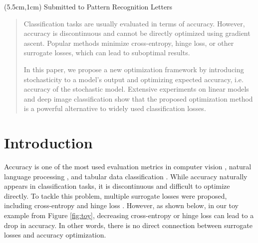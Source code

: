 \documentclass[nohyperref]{article}
\theoremstyle{plain}
\theoremstyle{definition}
\theoremstyle{remark}
\begin{document}





\printAffiliationsAndNotice{} 

\begin{textblock*}{12cm}(5.5cm,1cm) \LARGE \textcolor{gray!50}{Submitted to Pattern Recognition Letters}
\end{textblock*}

\begin{abstract}
Classification tasks are usually evaluated in terms of accuracy. However, accuracy is discontinuous and cannot be directly optimized using gradient ascent. Popular methods minimize cross-entropy, hinge loss, or other surrogate losses, which can lead to suboptimal results.

In this paper, we propose a new optimization framework by introducing stochasticity to a model's output and optimizing expected accuracy, i.e. accuracy of the stochastic model. Extensive experiments on linear models and deep image classification show that the proposed optimization method is a powerful alternative to widely used classification losses.



\end{abstract}
\setcounter{footnote}{1}

\section{Introduction}
Accuracy is one of the most used evaluation metrics in computer vision \cite{lecun1998mnist,krizhevsky2009cifar,krizhevsky2012imagenetcls}, natural language processing \cite{maas2011nlpsentiment, zhang2015textcls}, and tabular data classification \cite{arik2021tabnet}.
While accuracy naturally appears in classification tasks, it is discontinuous and difficult to optimize directly. To tackle this problem, multiple surrogate losses were proposed, including cross-entropy and hinge loss \cite{wang2022comprehensive}. However, as shown below, in our toy example from Figure \ref{fig:toy}, decreasing cross-entropy or hinge loss can lead to a drop in accuracy. In other words, there is no direct connection between surrogate losses and accuracy optimization.
\end{document}
